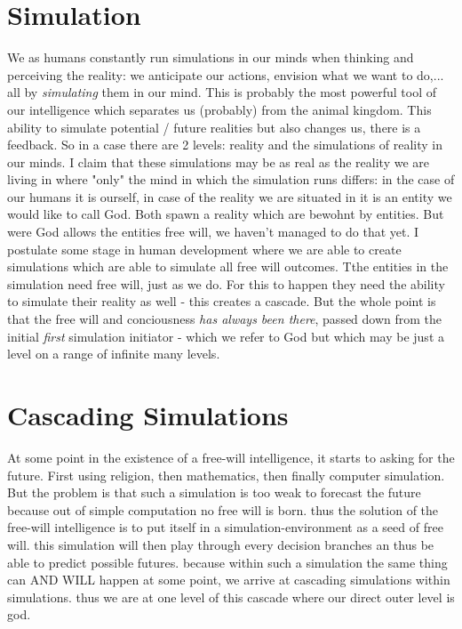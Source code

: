\documentclass[twocolumn]{article}
\begin{document}
\section{Simulation}
We as humans constantly run simulations in our minds when thinking and perceiving the reality: we anticipate our actions, envision what we want to do,... all by \textit{simulating} them in our mind. This is probably the most powerful tool of our intelligence which separates us (probably) from the animal kingdom. This ability to simulate potential / future realities but also changes us, there is a feedback.  So in a case there are 2 levels: reality and the simulations of reality in our minds.
I claim that these simulations may be as real as the reality we are living in where "only" the mind in which the simulation runs differs: in the case of our humans it is ourself, in case of the reality we are situated in it is an entity we would like to call God.
Both spawn a reality which are bewohnt by entities. But were God allows the entities free will, we haven't managed to do that yet. I postulate some stage in human development where we are able to create simulations which are able to simulate all free will outcomes. Tthe entities in the simulation need free will, just as we do. For this to happen they need the ability to simulate their reality as well - this creates a cascade. But the whole point is that the free will and conciousness \textit{has always been there}, passed down from the initial \textit{first} simulation initiator - which we refer to God but which may be just a level on a range of infinite many levels. 

\section{Cascading Simulations}
At some point in the existence of a free-will intelligence, it starts to asking for the future. First using religion, then mathematics, then finally computer simulation. But the problem is that such a simulation is too weak to forecast the future because out of simple computation no free will is born. thus the solution of the free-will intelligence is to put itself in a simulation-environment as a seed of free will. this simulation will then play through every decision branches an thus be able to predict possible futures. because within such a simulation the same thing can AND WILL happen at some point, we arrive at cascading simulations within simulations. thus we are at one level of this cascade where our direct outer level is god.
\end{document}
